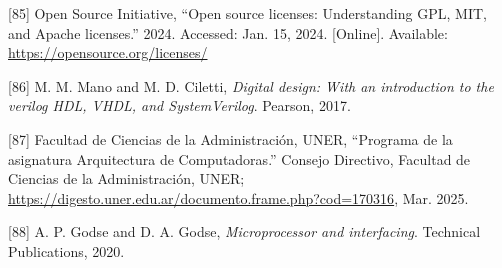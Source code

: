 \documentclass[12pt,oneside]{templates/unerthesis}
\newcommand{\CSLLeftMargin}[1]{#1} %
\newcommand{\CSLRightInline}[1]{#1} %
\newlength{\cslhangindent}
\newenvironment{CSLReferences}[2] %
 {\setlength{\parindent}{0pt}%
  \setlength{\leftskip}{#1 pt\relax}%
  \setlength{\parskip}{#2 pt\relax}%
  \everypar{\setlength{\hangindent}{\cslhangindent}}}
 {\par}
\begin{document}
\begin{CSLReferences}{0}{0}
\leavevmode{}%
\CSLLeftMargin{{[}85{]} }%
\CSLRightInline{Open Source Initiative, {``Open source licenses: Understanding {GPL}, {MIT}, and {Apache} licenses.''} 2024. Accessed: Jan. 15, 2024. {[}Online{]}. Available: \url{https://opensource.org/licenses/}}

\leavevmode{}%
\CSLLeftMargin{{[}86{]} }%
\CSLRightInline{M. M. Mano and M. D. Ciletti, \emph{Digital design: With an introduction to the verilog HDL, VHDL, and SystemVerilog}. Pearson, 2017.}

\leavevmode{}%
\CSLLeftMargin{{[}87{]} }%
\CSLRightInline{Facultad de Ciencias de la Administración, UNER, {``{Programa de la asignatura Arquitectura de Computadoras}.''} Consejo Directivo, Facultad de Ciencias de la Administración, UNER; \url{https://digesto.uner.edu.ar/documento.frame.php?cod=170316}, Mar. 2025.}

\leavevmode{}%
\CSLLeftMargin{{[}88{]} }%
\CSLRightInline{A. P. Godse and D. A. Godse, \emph{Microprocessor and interfacing}. Technical Publications, 2020.}

\end{CSLReferences}

%


\end{document}
